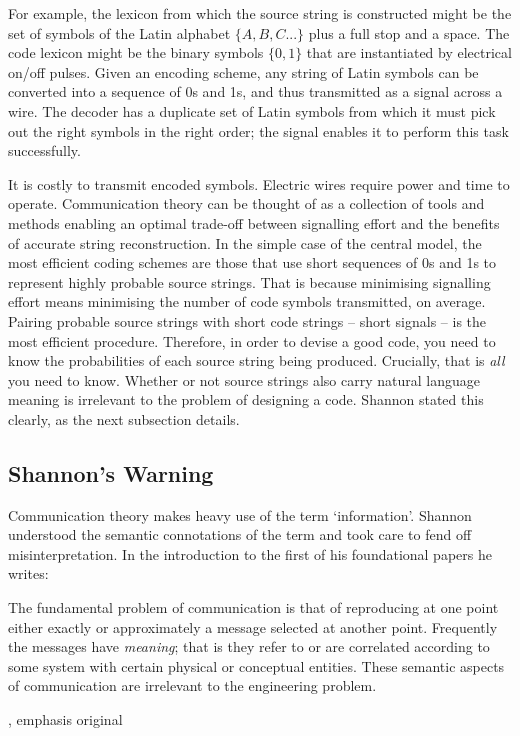 

For example, the lexicon from which the source string is constructed might be the set of symbols of the Latin alphabet $\{A,B,C...\}$ plus a full stop and a space.
The code lexicon might be the binary symbols $\{0,1\}$ that are instantiated by electrical on/off pulses.
Given an encoding scheme, any string of Latin symbols can be converted into a sequence of 0s and 1s, and thus transmitted as a signal across a wire.
The decoder has a duplicate set of Latin symbols from which it must pick out the right symbols in the right order; the signal enables it to perform this task successfully.

It is costly to transmit encoded symbols.
Electric wires require power and time to operate.
Communication theory can be thought of as a collection of tools and methods enabling an optimal trade-off between signalling effort and the benefits of accurate string reconstruction.
In the simple case of the central model, the most efficient coding schemes are those that use short sequences of 0s and 1s to represent highly probable source strings.
That is because minimising signalling effort means minimising the number of code symbols transmitted, on average.
Pairing probable source strings with short code strings -- short signals -- is the most efficient procedure.
Therefore, in order to devise a good code, you need to know the probabilities of each source string being produced.
Crucially, that is \textit{all} you need to know.
Whether or not source strings also carry natural language meaning is irrelevant to the problem of designing a code.
Shannon stated this clearly, as the next subsection details.

\subsection{Shannon's Warning}\label{subsec:warning}

Communication theory makes heavy use of the term `information'.
Shannon understood the semantic connotations of the term and took care to fend off misinterpretation.
In the introduction to the first of his foundational papers he writes:

\begin{myquote}
The fundamental problem of communication is that of reproducing at one point either exactly or approximately a message selected at another point. Frequently the messages have \emph{meaning}; that is they refer to or are correlated according to some system with certain physical or conceptual entities. These semantic aspects of communication are irrelevant to the engineering problem.
\par\hspace*{\fill}\citet[379]{shannon1948mathematicalc}, emphasis original
\end{myquote}


